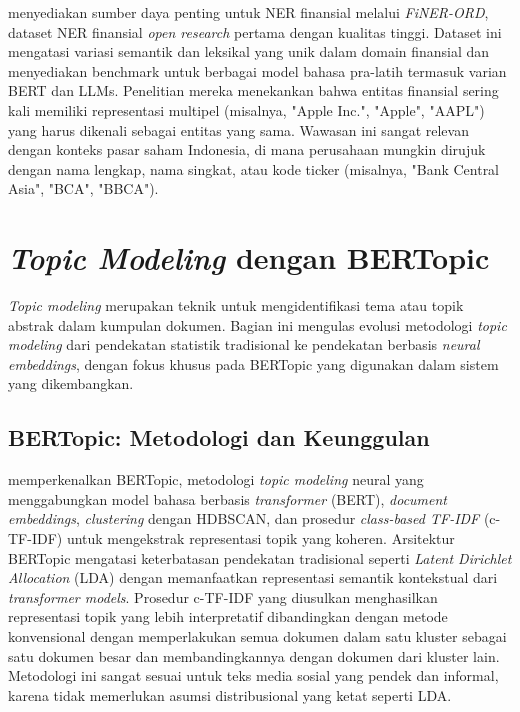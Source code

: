\textcite{shah2023} menyediakan sumber daya penting untuk NER finansial melalui \textit{FiNER-ORD}, dataset NER finansial \textit{open research} pertama dengan kualitas tinggi. Dataset ini mengatasi variasi semantik dan leksikal yang unik dalam domain finansial dan menyediakan benchmark untuk berbagai model bahasa pra-latih termasuk varian BERT dan LLMs. Penelitian mereka menekankan bahwa entitas finansial sering kali memiliki representasi multipel (misalnya, "Apple Inc.", "Apple", "AAPL") yang harus dikenali sebagai entitas yang sama. Wawasan ini sangat relevan dengan konteks pasar saham Indonesia, di mana perusahaan mungkin dirujuk dengan nama lengkap, nama singkat, atau kode ticker (misalnya, "Bank Central Asia", "BCA", "BBCA").

\section{\textit{Topic Modeling} dengan BERTopic}
\label{sec:topic-modeling}

\textit{Topic modeling} merupakan teknik untuk mengidentifikasi tema atau topik abstrak dalam kumpulan dokumen. Bagian ini mengulas evolusi metodologi \textit{topic modeling} dari pendekatan statistik tradisional ke pendekatan berbasis \textit{neural embeddings}, dengan fokus khusus pada BERTopic yang digunakan dalam sistem yang dikembangkan.

\subsection{BERTopic: Metodologi dan Keunggulan}

\textcite{grootendorst2022} memperkenalkan BERTopic, metodologi \textit{topic modeling} neural yang menggabungkan model bahasa berbasis \textit{transformer} (BERT), \textit{document embeddings}, \textit{clustering} dengan HDBSCAN, dan prosedur \textit{class-based TF-IDF} (c-TF-IDF) untuk mengekstrak representasi topik yang koheren. Arsitektur BERTopic mengatasi keterbatasan pendekatan tradisional seperti \textit{Latent Dirichlet Allocation} (LDA) dengan memanfaatkan representasi semantik kontekstual dari \textit{transformer models}. Prosedur c-TF-IDF yang diusulkan menghasilkan representasi topik yang lebih interpretatif dibandingkan dengan metode konvensional dengan memperlakukan semua dokumen dalam satu kluster sebagai satu dokumen besar dan membandingkannya dengan dokumen dari kluster lain. Metodologi ini sangat sesuai untuk teks media sosial yang pendek dan informal, karena tidak memerlukan asumsi distribusional yang ketat seperti LDA.

